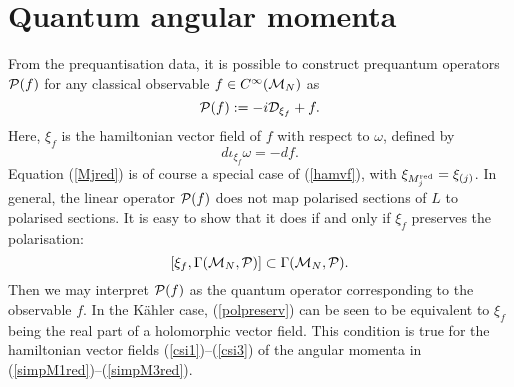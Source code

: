 \documentclass[a4paper,11pt]{article}
\begin{document}
\section{Quantum angular momenta}


From the prequantisation data, it is possible to 
construct prequantum operators ${\cal P}(f)$ for any classical observable 
$f\in C^{\infty}({\cal M}_{N})$ as
\begin{equation}\label{preqP}
{\cal P}(f):=-i{\cal D}_{\xi_{f}}+f.
\end{equation}
Here, $\xi_{f}$ is the hamiltonian vector field of $f$ with respect 
to $\omega$, defined by 
\begin{equation}\label{hamvf}
d\iota_{\xi_{f}}\omega=-df.
\end{equation}
Equation (\ref{Mjred}) is of course a special case of (\ref{hamvf}),
with $\xi_{M^{\rm red}_{j}}=\xi_{(j)}$.
In general, the linear operator ${\cal P}(f)$ does not map polarised
sections of $L$ to polarised sections. It is easy to show that it does
if and only if $\xi_{f}$ preserves the polarisation:
\begin{equation}\label{polpreserv}
[\xi_{f},\Gamma({\cal M}_{N},{\cal P})]\subset\Gamma({\cal M}_{N},{\cal P}).
\end{equation}
Then we may interpret ${\cal P}(f)$ as the quantum operator
corresponding to the observable $f$.
In the K\"ahler case, (\ref{polpreserv}) can be seen to be 
equivalent to $\xi_{f}$ being the real part of a holomorphic vector field.
This condition is true for the hamiltonian vector fields 
(\ref{csi1})--(\ref{csi3}) of the
angular momenta in (\ref{simpM1red})--(\ref{simpM3red}).
\end{document}
